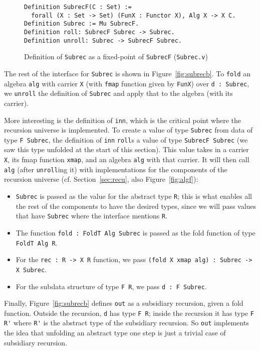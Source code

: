 \documentclass[a4paper,USenglish]{lipics-v2021}
\begin{document}
\begin{figure}
\begin{verbatim}
Definition SubrecF(C : Set) := 
  forall (X : Set -> Set) (FunX : Functor X), Alg X -> X C.
Definition Subrec := Mu SubrecF.
Definition roll: SubrecF Subrec -> Subrec.
Definition unroll: Subrec -> SubrecF Subrec.
\end{verbatim}
\caption{Definition of \texttt{Subrec} as a fixed-point of \texttt{SubrecF} (\texttt{Subrec.v})}
\label{fig:subrec}
\end{figure}

The rest of the interface for \verb|Subrec| is shown in
Figure~\ref{fig:subrecb}.  To \verb|fold| an algebra
\verb|alg| with carrier \verb|X| (with \verb|fmap| function given by
\verb|FunX|) over \verb|d : Subrec|, we \verb|unroll| the
definition of \verb|Subrec| and apply that to the algebra (with its
carrier).

More interesting is the definition of \verb|inn|, which is the
critical point where the recursion universe is implemented.  To create
a value of type \verb|Subrec| from data of type \verb|F Subrec|, the
definition of \verb|inn| \verb|roll|s a value of type
\verb|SubrecF Subrec| (we saw this type unfolded at the start of
this section).  This value takes in a carrier
\verb|X|, its fmap function \verb|xmap|, and an algebra \verb|alg|
with that carrier.  It will then call \verb|alg| (after \verb|unroll|ing
it) with implementations for the components of the recursion universe
(cf. Section~\ref{sec:recu}, also Figure~\ref{fig:algf}):
\begin{itemize}
\item \verb|Subrec| is passed as the value for the abstract type \verb|R|; this is what enables all
  the rest of the components to have the desired types, since we will pass values that have \verb|Subrec|
  where the interface mentions \verb|R|.
\item The function \verb|fold : FoldT Alg Subrec| is passed as
  the fold function of type \verb|FoldT Alg R|. 
\item For the \verb|rec : R -> X R| function, we pass \verb|(fold X xmap alg) : Subrec -> X Subrec|.
\item For the subdata structure of type \verb|F R|, we pass \verb|d : F Subrec|. 
\end{itemize}

Finally, Figure~\ref{fig:subrecb} defines \verb|out| as a subsidiary
recursion, given a fold function.
Outside the recursion, \verb|d| has type \verb|F R|; inside the
recursion it has type \verb|F R'| where \verb|R'| is the abstract type
of the subsidiary recursion.  So \verb|out| implements the idea that
unfolding an abstract type one step is just a trivial case of
subsidiary recursion.
\end{document}
